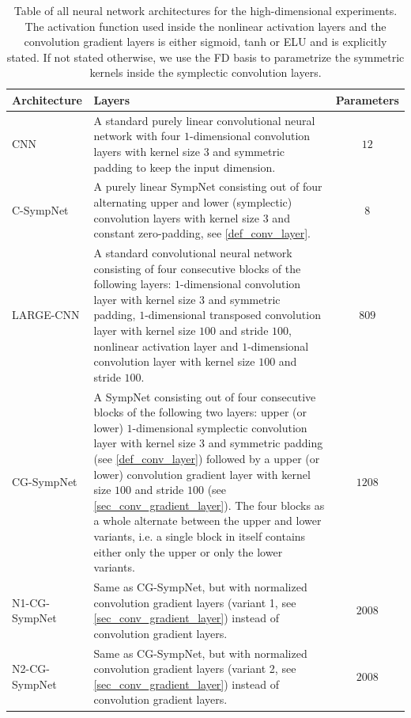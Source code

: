 \documentclass[twoside,a4paper]{article}
\begin{document}
\begin{table}
	\centering
	\begin{tabular}{lp{8cm}c}
		\toprule Architecture & Layers & Parameters \\
		\midrule CNN & 
		A standard purely linear convolutional neural network with four $1$-dimensional
		convolution layers with kernel size $3$ and symmetric padding to keep the input dimension. 
		& $12$ \\
		C-SympNet & A purely linear SympNet consisting out of four alternating upper and lower
		(symplectic) convolution layers with kernel size $3$ and constant zero-padding,
		see \cref{def_conv_layer}. 
		& $8$ \\
		LARGE-CNN &
		A standard convolutional neural network consisting of four consecutive blocks of
		the following layers: $1$-dimensional convolution layer with kernel size $3$
		and symmetric padding, $1$-dimensional transposed convolution layer
		with kernel size $100$ and stride $100$, nonlinear activation layer
		and $1$-dimensional convolution layer with kernel size $100$ and stride $100$. 
		& $809$ \\
		CG-SympNet & 
		A SympNet consisting out of four consecutive blocks of
		the following two layers: upper (or lower) $1$-dimensional symplectic convolution layer with
		kernel size $3$ and symmetric padding (see \cref{def_conv_layer}) 
		followed by a upper (or lower) convolution gradient layer
		with kernel size $100$ and stride $100$ (see \cref{sec_conv_gradient_layer}). 
		The four blocks as a whole alternate between
		the upper and lower variants, i.e. a single block in itself contains either only the upper or only
		the lower variants. 
		& $1208$ \\
		N1-CG-SympNet & Same as CG-SympNet, but with normalized convolution gradient layers
		(variant 1, see \cref{sec_conv_gradient_layer}) instead of convolution gradient layers.
		& $2008$ \\
		N2-CG-SympNet & Same as CG-SympNet, but with normalized convolution gradient layers
		(variant 2, see \cref{sec_conv_gradient_layer}) instead of convolution gradient layers.
		& $2008$ \\ \bottomrule
	\end{tabular}
	\caption{Table of all neural network architectures for the
	high-dimensional experiments. The activation function used inside the nonlinear activation layers
	and the convolution gradient layers is either sigmoid, tanh or ELU and is explicitly stated.
	If not stated otherwise, we use the FD basis to parametrize the symmetric kernels 
	inside the symplectic convolution layers.}\label{table_high_dim_arch}
\end{table}
\end{document}

